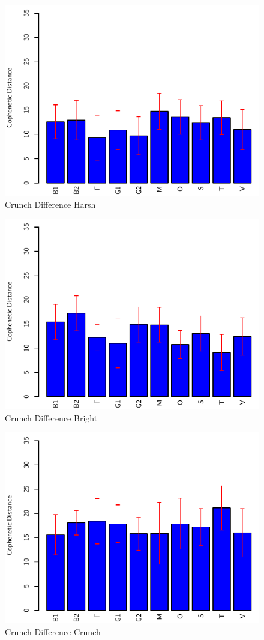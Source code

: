		\begin{figure}[h!]
			\centering
			\includegraphics{chapter7/Images/CrunchDifferenceHarshBar.pdf}
			\caption{Crunch Difference Harsh}
		\end{figure}

		\begin{figure}[h!]
			\centering
			\includegraphics{chapter7/Images/CrunchDifferenceBrightBar.pdf}
			\caption{Crunch Difference Bright}
		\end{figure}

		\begin{figure}[h!]
			\centering
			\includegraphics{chapter7/Images/CrunchDifferenceCrunchBar.pdf}
			\caption{Crunch Difference Crunch}
		\end{figure}
